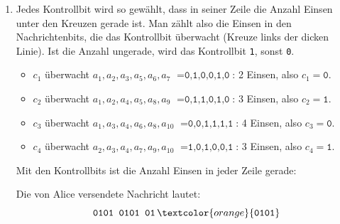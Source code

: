 \begin{myexercise}
    \begin{myanswer}
        \begin{enumerate}
            \item Jedes Kontrollbit wird so gewählt, dass in seiner Zeile
                  die Anzahl Einsen unter den Kreuzen gerade ist. Man zählt
                  also die Einsen in den Nachrichtenbits, die das Kontrollbit
                  überwacht (Kreuze links der dicken Linie). Ist die Anzahl
                  ungerade, wird das Kontrollbit \texttt{1}, sonst \texttt{0}.
                  \begin{itemize}
                      \item \(c_1\) überwacht \(a_1,a_2,a_3,a_5,a_6,a_7\)
                            \(=\texttt{0,1,0,0,1,0}\): 2 Einsen, also \(c_1=\texttt{0}\).
                      \item \(c_2\) überwacht \(a_1,a_2,a_4,a_5,a_8,a_9\)
                            \(=\texttt{0,1,1,0,1,0}\): 3 Einsen, also \(c_2=\texttt{1}\).
                      \item \(c_3\) überwacht \(a_1,a_3,a_4,a_6,a_8,a_{10}\)
                            \(=\texttt{0,0,1,1,1,1}\): 4 Einsen, also \(c_3=\texttt{0}\).
                      \item \(c_4\) überwacht \(a_2,a_3,a_4,a_7,a_9,a_{10}\)
                            \(=\texttt{1,0,1,0,0,1}\): 3 Einsen, also \(c_4=\texttt{1}\).
                  \end{itemize}
                  Mit den Kontrollbits ist die Anzahl Einsen in jeder Zeile gerade:
                  \begin{center}
                  \end{center}
                  Die von Alice versendete Nachricht lautet:
                  \[
                      \texttt{0101 0101 01}\,
                      \textcolor{orange}{\texttt{0101}}
                  \]


\end{enumerate}
\end{myanswer}
\end{myexercise}
